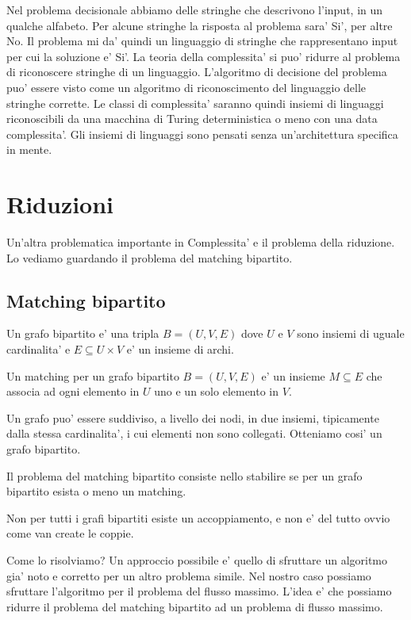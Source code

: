 Nel problema decisionale abbiamo delle stringhe che descrivono l'input, in un qualche alfabeto.  Per
alcune stringhe la risposta al problema sara' Si', per altre No. Il problema mi da' quindi un
linguaggio di stringhe che rappresentano input per cui la soluzione e' Si'. La teoria della
complessita' si puo' ridurre al problema di riconoscere stringhe di un linguaggio. L'algoritmo di
decisione del problema puo' essere visto come un algoritmo di riconoscimento del linguaggio delle
stringhe corrette. Le classi di complessita' saranno quindi insiemi di linguaggi riconoscibili da
una macchina di Turing deterministica o meno con una data complessita'.  Gli insiemi di linguaggi
sono pensati senza un'architettura specifica in mente.

\section{Riduzioni}

Un'altra problematica importante in Complessita' e il problema della riduzione. Lo vediamo guardando
il problema del matching bipartito.

\subsection{Matching bipartito}

\begin{defn}
    Un grafo bipartito e' una tripla $B = (U,V,E)$ dove $U$ e $V$ sono insiemi di uguale
    cardinalita' e $E \subseteq U \times V$ e' un insieme di archi.
\end{defn}

\begin{defn}
    Un matching per un grafo bipartito $B = (U,V,E)$ e' un insieme $M \subseteq E$ che associa ad
    ogni elemento in $U$ uno e un solo elemento in $V$.
\end{defn}

Un grafo puo' essere suddiviso, a livello dei nodi, in due insiemi, tipicamente dalla stessa
cardinalita', i cui elementi non sono collegati. Otteniamo cosi' un grafo bipartito.

Il problema del matching bipartito consiste nello stabilire se per un grafo bipartito esista o meno
un matching.

Non per tutti i grafi bipartiti esiste un accoppiamento, e non e' del tutto ovvio come van create le
coppie.

Come lo risolviamo? Un approccio possibile e' quello di sfruttare un algoritmo gia' noto e corretto
per un altro problema simile. Nel nostro caso possiamo sfruttare l'algoritmo per il problema del
flusso massimo. L'idea e' che possiamo ridurre il problema del matching bipartito ad un problema di
flusso massimo.

